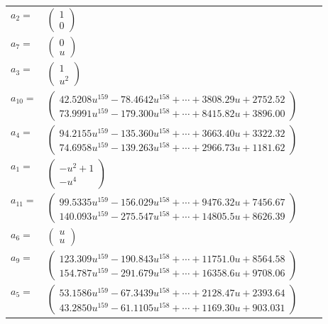 \documentclass[1p]{elsarticle_modified}
\theoremstyle{definition}
\begin{document}
\begin{tabular}{m{7pt} m{180pt} m{7pt} m{180pt} }
\flushright $a_{2}=$&$\begin{pmatrix}1\\0\end{pmatrix}$ \\
\flushright $a_{7}=$&$\begin{pmatrix}0\\u\end{pmatrix}$ \\
\flushright $a_{3}=$&$\begin{pmatrix}1\\u^2\end{pmatrix}$ \\
\flushright $a_{10}=$&$\begin{pmatrix}42.5208 u^{159}-78.4642 u^{158}+\cdots+3808.29 u+2752.52\\73.9991 u^{159}-179.300 u^{158}+\cdots+8415.82 u+3896.00\end{pmatrix}$ \\
\flushright $a_{4}=$&$\begin{pmatrix}94.2155 u^{159}-135.360 u^{158}+\cdots+3663.40 u+3322.32\\74.6958 u^{159}-139.263 u^{158}+\cdots+2966.73 u+1181.62\end{pmatrix}$ \\
\flushright $a_{1}=$&$\begin{pmatrix}- u^2+1\\- u^4\end{pmatrix}$ \\
\flushright $a_{11}=$&$\begin{pmatrix}99.5335 u^{159}-156.029 u^{158}+\cdots+9476.32 u+7456.67\\140.093 u^{159}-275.547 u^{158}+\cdots+14805.5 u+8626.39\end{pmatrix}$ \\
\flushright $a_{6}=$&$\begin{pmatrix}u\\u\end{pmatrix}$ \\
\flushright $a_{9}=$&$\begin{pmatrix}123.309 u^{159}-190.843 u^{158}+\cdots+11751.0 u+8564.58\\154.787 u^{159}-291.679 u^{158}+\cdots+16358.6 u+9708.06\end{pmatrix}$ \\
\flushright $a_{5}=$&$\begin{pmatrix}53.1586 u^{159}-67.3439 u^{158}+\cdots+2128.47 u+2393.64\\43.2850 u^{159}-61.1105 u^{158}+\cdots+1169.30 u+903.031\end{pmatrix}$ \\

\end{tabular}
\end{document}
